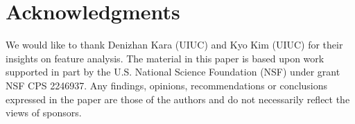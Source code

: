\section*{Acknowledgments}
{We would like to thank Denizhan Kara (UIUC) and Kyo Kim (UIUC) for their insights on feature analysis. The material in this paper is based upon work supported in part by the U.S. National Science Foundation (NSF) under grant NSF CPS 2246937. Any findings, opinions, recommendations or conclusions expressed in the paper are those of the authors and do not necessarily reflect the views of sponsors.}